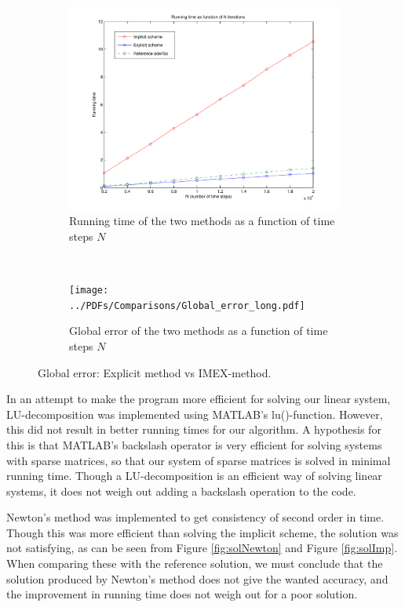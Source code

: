 \begin{figure}[H]
        \centering
        \begin{subfigure}[b]{0.52\textwidth}
                \includegraphics[width=\textwidth]{../PDFs/Comparisons/running_time3.pdf}
                \caption{Running time of the two methods as a function of time steps $N$}
                \label{fig:runTime}
        \end{subfigure}%
        ~
        \begin{subfigure}[b]{0.52\textwidth}
                \texttt{[image: ../PDFs/Comparisons/Global\_error\_long.pdf]}
                \caption{Global error of the two methods as a function of time steps $N$}
                \label{fig:global}
        \end{subfigure}
        \caption{Global error: Explicit method vs IMEX-method.}
        \label{fig:runTimeN}
\end{figure}

In an attempt to make the program more efficient for solving our linear system, LU-decomposition was implemented using MATLAB's lu()-function. However, this did not result in better running times for our algorithm. A hypothesis for this is that MATLAB's backslash operator is very efficient for solving systems with sparse matrices, so that our system of sparse matrices is solved in minimal running time. Though a LU-decomposition is an efficient way of solving linear systems, it does not weigh out adding a backslash operation to the code.

Newton's method was implemented to get consistency of second order in time. Though this was more efficient than solving the implicit scheme, the solution was not satisfying, as can be seen from Figure \ref{fig:solNewton} and Figure \ref{fig:solImp}. When comparing these with the reference solution, we must conclude that the solution produced by Newton's method does not give the wanted accuracy, and the improvement in running time does not weigh out for a poor solution.

